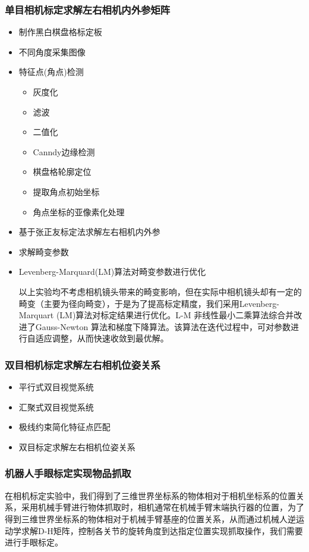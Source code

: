 \documentclass{article}
\begin{document}
\subsubsection{单目相机标定求解左右相机内外参矩阵}
\begin{itemize}
	\item 制作黑白棋盘格标定板
	\item 不同角度采集图像
	\item 特征点(角点)检测
	\begin{itemize}
		\item 灰度化
		\item 滤波
		\item 二值化
		\item Canndy边缘检测
		\item 棋盘格轮廓定位
		\item 提取角点初始坐标
		\item 角点坐标的亚像素化处理
	\end{itemize}
	\item 基于张正友标定法求解左右相机内外参
	\item 求解畸变参数
	\item Levenberg-Marquard(LM)算法对畸变参数进行优化
	
以上实验均不考虑相机镜头带来的畸变影响，但在实际中相机镜头却有一定的畸变（主要为径向畸变），于是为了提高标定精度，我们采用Levenberg-Marquart (LM)算法对标定结果进行优化。L-M 非线性最小二乘算法综合并改进了Gauss-Newton 算法和梯度下降算法。该算法在迭代过程中，可对参数进行自适应调整，从而快速收敛到最优解。
\end{itemize}
\subsubsection{双目相机标定求解左右相机位姿关系}
\begin{itemize}
	\item 平行式双目视觉系统
	\item 汇聚式双目视觉系统
	\item 极线约束简化特征点匹配
	\item 双目标定求解左右相机位姿关系
\end{itemize}
\subsubsection{机器人手眼标定实现物品抓取}

在相机标定实验中，我们得到了三维世界坐标系的物体相对于相机坐标系的位置关系，采用机械手臂进行物体抓取时，相机通常在机械手臂末端执行器的位置，为了得到三维世界坐标系的物体相对于机械手臂基座的位置关系，从而通过机械人逆运动学求解D-H矩阵，控制各关节的旋转角度到达指定位置实现抓取操作，我们需要进行手眼标定。
\end{document}
